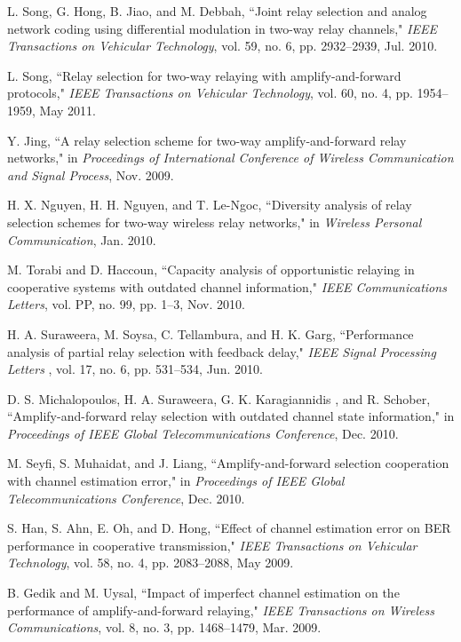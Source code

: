 \documentclass[onecolumn,letterpaper,11pt,draftclsnofoot]{IEEEtran}
\begin{document}
\begin{thebibliography}{1}
 L. Song, G. Hong, B. Jiao, and M. Debbah, ``Joint relay selection and analog network coding using differential modulation in two-way relay channels,"
\emph{IEEE Transactions on Vehicular Technology}, vol. 59, no. 6,
pp. 2932--2939, Jul. 2010.

 L. Song, ``Relay selection for two-way relaying with
amplify-and-forward protocols," \emph{IEEE Transactions on Vehicular
Technology}, vol. 60, no. 4, pp. 1954--1959, May 2011.

 Y. Jing, ``A relay selection scheme for two-way amplify-and-forward relay
networks," in \emph{Proceedings of International Conference of
Wireless Communication and Signal Process}, Nov. 2009.

H. X. Nguyen, H. H. Nguyen, and T. Le-Ngoc, ``Diversity analysis of
relay selection schemes for two-way wireless relay networks," in
\emph{Wireless  Personal Communication}, Jan.  2010.

M. Torabi and D. Haccoun, ``Capacity analysis of opportunistic
relaying in cooperative systems with outdated channel information,"
\emph{IEEE Communications Letters}, vol. PP, no. 99, pp. 1--3, Nov.
2010.

H. A. Suraweera, M. Soysa, C. Tellambura, and H. K. Garg, ``Performance analysis of partial relay selection with feedback delay,"
\emph{IEEE Signal Processing Letters }, vol. 17, no. 6, pp.
531--534, Jun. 2010.

D. S. Michalopoulos, H. A. Suraweera, G. K. Karagiannidis , and R. Schober, ``Amplify-and-forward relay selection with outdated
channel state information," in \emph{Proceedings of IEEE Global
Telecommunications Conference}, Dec. 2010.

M. Seyfi, S. Muhaidat, and J. Liang, ``Amplify-and-forward
selection cooperation with channel estimation error," in
\emph{Proceedings of IEEE Global Telecommunications Conference},
Dec. 2010.

S. Han, S. Ahn, E. Oh, and D. Hong, ``Effect
of channel estimation error on BER performance in cooperative
transmission," \emph{IEEE Transactions on Vehicular Technology},
vol. 58, no. 4, pp. 2083--2088, May 2009.

B. Gedik and M. Uysal, ``Impact of imperfect channel estimation
on the performance of amplify-and-forward relaying," \emph{IEEE
Transactions on Wireless Communications}, vol. 8, no. 3, pp.
1468--1479, Mar. 2009.


\end{thebibliography}
\end{document}
